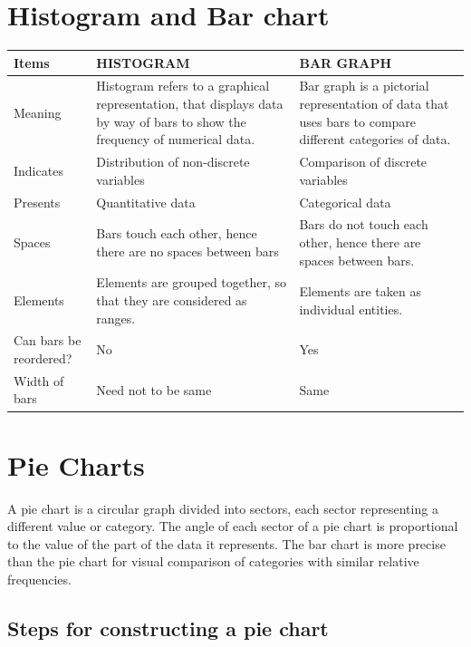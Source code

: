\documentclass[
]{book}
\begin{document}
\hypertarget{histogram-and-bar-chart}{%
\section{Histogram and Bar chart}\label{histogram-and-bar-chart}}

\begin{longtable}[]{@{}
  >{\raggedright\arraybackslash}p{}
  >{\raggedright\arraybackslash}p{}
  >{\raggedright\arraybackslash}p{}@{}}
\toprule
Items & HISTOGRAM & BAR GRAPH \\
\midrule
\endhead
Meaning & Histogram refers to a graphical representation, that displays data by way of bars to show the frequency of numerical data. & Bar graph is a pictorial representation of data that uses bars to compare different categories of data. \\
Indicates & Distribution of non-discrete variables & Comparison of discrete variables \\
Presents & Quantitative data & Categorical data \\
Spaces & Bars touch each other, hence there are no spaces between bars & Bars do not touch each other, hence there are spaces between bars. \\
Elements & Elements are grouped together, so that they are considered as ranges. & Elements are taken as individual entities. \\
Can bars be reordered? & No & Yes \\
Width of bars & Need not to be same & Same \\
\bottomrule
\end{longtable}

\hypertarget{pie-charts}{%
\section{Pie Charts}\label{pie-charts}}

A pie chart is a circular graph divided into sectors, each sector representing a different value or category. The angle of each sector of a pie chart is proportional to the value of the part of the data it represents. The bar chart is more precise than the pie chart for visual comparison of categories with similar relative frequencies.

\hypertarget{steps-for-constructing-a-pie-chart}{%
\subsection{Steps for constructing a pie chart}\label{steps-for-constructing-a-pie-chart}}
\end{document}
